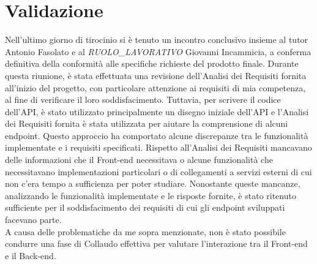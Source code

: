 \section{Validazione}
Nell’ultimo giorno di tirocinio si è tenuto un incontro conclusivo insieme al tutor Antonio Fasolato e al \textit{RUOLO\_LAVORATIVO} Giovanni Incammicia, a conferma definitiva della conformità alle specifiche richieste del prodotto finale. Durante questa riunione, è stata effettuata una revisione dell'Analisi dei Requisiti fornita all'inizio del progetto, con particolare attenzione ai requisiti di mia competenza, al fine di verificare il loro soddisfacimento. Tuttavia, per scrivere il codice dell’API, è stato utilizzato principalmente un disegno iniziale dell’API e l’Analisi dei Requisiti fornita è stata utilizzata per aiutare la comprensione di alcuni endpoint. Questo approccio ha comportato alcune discrepanze tra le funzionalità implementate e i requisiti specificati. Rispetto all’Analisi dei Requisiti mancavano delle informazioni che il Front-end necessitava o alcune funzionalità che necessitavano implementazioni particolari o di collegamenti a servizi esterni di cui non c’era tempo a sufficienza per poter studiare. Nonostante queste mancanze, analizzando le funzionalità implementate e le risposte fornite, è stato ritenuto sufficiente per il soddisfacimento dei requisiti di cui gli endpoint sviluppati facevano parte.\\
A causa delle problematiche da me sopra menzionate, non è stato possibile condurre una fase di Collaudo effettiva per valutare l'interazione tra il Front-end e il Back-end.